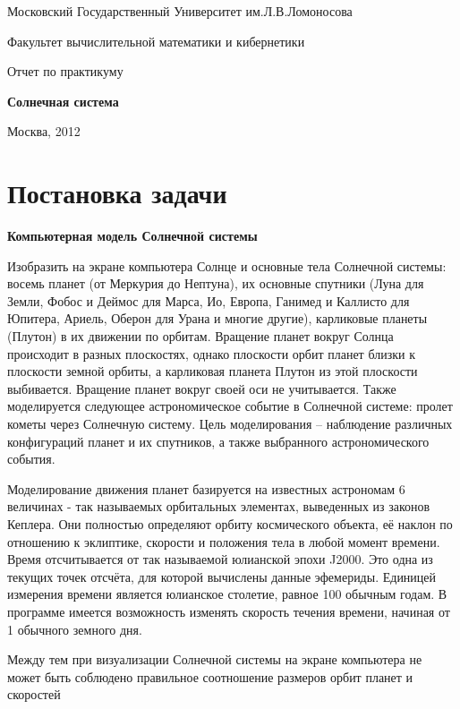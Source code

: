 \documentclass[oneside,final]{article}
\begin{document}
\large
\thispagestyle{empty}
\par \centerline{Московский Государственный Университет им.Л.В.Ломоносова}
\par \centerline{Факультет вычислительной математики и кибернетики}
\vfill
\par \centerline{Отчет по практикуму}
\par \centerline{\textbf{Солнечная система}}
\vfill
\par {}
\vfill
\par \centerline{Москва, 2012}
\newpage
\section{Постановка задачи}

\par \textbf{Компьютерная модель Солнечной системы}
\par Изобразить на экране компьютера Солнце и основные тела Солнечной
системы: восемь планет (от Меркурия до Нептуна), их основные спутники
(Луна для Земли, Фобос и Деймос для Марса, Ио, Европа, Ганимед и
Каллисто для Юпитера, Ариель, Оберон для Урана и многие другие),
карликовые планеты (Плутон) в их движении
по
орбитам. Вращение планет вокруг Солнца происходит в
разных плоскостях, однако плоскости орбит планет близки к плоскости
земной орбиты, а карликовая планета Плутон из этой плоскости выбивается.
Вращение
планет вокруг своей оси не учитывается. Также
моделируется следующее астрономическое событие в Солнечной системе: пролет
кометы через Солнечную систему.
\oar Цель моделирования – наблюдение различных конфигураций планет и их
спутников, а также выбранного астрономического события.
\par Моделирование движения планет базируется на известных астрономам 6
величинах - так называемых орбитальных элементах, выведенных из законов
Кеплера. Они полностью определяют орбиту космического объекта, её наклон
по отношению к эклиптике, скорости и положения тела в любой момент
времени. Время отсчитывается от так называемой юлианской эпохи J2000.
Это одна из текущих точек отсчёта, для которой вычислены данные эфемериды.
Единицей измерения времени является юлианское столетие, равное 100
обычным годам. В программе имеется возможность изменять скорость течения
времени, начиная от 1 обычного земного дня.
\par Между тем при визуализации Солнечной системы на экране компьютера
не может быть соблюдено правильное соотношение размеров орбит планет и скоростей
\end{document}
